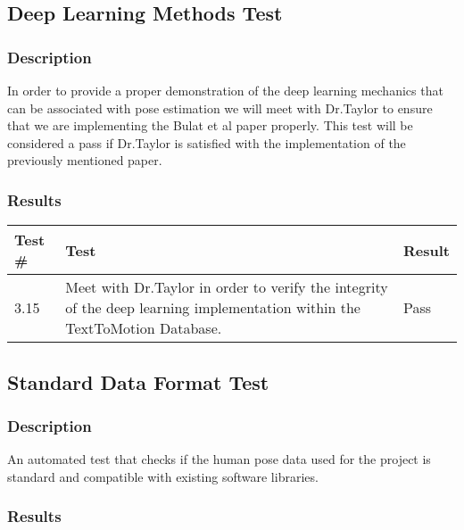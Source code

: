 \documentclass{scrreprt}
\begin{document}
\subsection{Deep Learning Methods Test}
\subsubsection{Description}

In order to provide a proper demonstration of the deep learning mechanics that can be associated with pose estimation we will meet with Dr.Taylor to ensure that we are implementing the Bulat et al paper properly. This test will be considered a pass if Dr.Taylor is satisfied with the implementation of the previously mentioned paper.

\subsubsection{Results}

\begin{table}[H]
        \centering
        \begin{tabular}{||p{0.75cm}|p{7.5cm}|p{1cm}||}
                \hline
                \textbf Test \# & \textbf Test & \textbf Result\\
                \hline\hline
                3.15 & Meet with Dr.Taylor in order to verify the integrity of the deep learning implementation within the TextToMotion Database. & Pass\\ %
                \hline
        \end{tabular}
\end{table}

\subsection{Standard Data Format Test}

\subsubsection{Description}

An automated test that checks if the human pose data used for the project is
standard and compatible with existing software libraries.

\subsubsection{Results}
\end{document}

